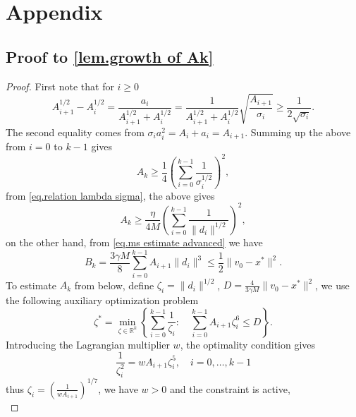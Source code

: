 \documentclass{article}
\begin{document}



\clearpage
\section*{Appendix}
\appendix
\subsection*{Proof to \autoref{lem.growth of Ak}}
\begin{proof}
    First note that for $i\geq 0$
    \begin{equation*}
        A_{i+1}^{1/2}-A_i^{1/2} = \frac{a_i}{A_{i+1}^{1/2}+A_i^{1/2}}=\frac{1}{A_{i+1}^{1/2}+A_i^{1/2}}\sqrt{\frac{A_{i+1}}{\sigma_i}}\geq \frac{1}{2\sqrt{\sigma_i}}.
    \end{equation*}
    The second equality comes from $\sigma_ia_i^2=A_i+a_i=A_{i+1}$. Summing up the above from $i=0$ to $k-1$ gives 
    \begin{equation*}
        A_k \geq \frac{1}{4} \left (\sum_{i=0}^{k-1}\frac{1}{\sigma_i^{1/2}}\right)^2,
    \end{equation*}
    from \eqref{eq.relation lambda sigma}, the above gives
    \begin{equation}\label{eq.Ak helper 1}
        A_k \geq \frac{\eta}{4M} \left (\sum_{i=0}^{k-1} \frac{1}{\|d_i\|^{1/2}}\right)^2,
    \end{equation}
    on the other hand, from \eqref{eq.ms estimate advanced} we have
    \begin{equation*}
        B_k = \frac{3\gamma M}{8}\sum_{i=0}^{k-1} A_{i+1}\|d_i\|^3 \leq \frac{1}{2}\|v_0-x^*\|^2.
    \end{equation*}
    To estimate $A_k$ from below, define $\zeta_i = \|d_i\|^{1/2}$, $D = \frac{4}{3\gamma M}\|v_0-x^*\|^2$, we use the following auxiliary optimization problem
    \begin{equation*}
\zeta^*=\min _{\zeta \in \mathbb{R}^k}\left\{\sum_{i=0}^{k-1} \frac{1}{\zeta_i}: \quad \sum_{i=0}^{k-1} A_{i+1} \zeta_i^6 \leq D\right\}.
\end{equation*}
Introducing the Lagrangian multiplier $w$, the optimality condition gives 
\begin{equation*}
\frac{1}{\zeta_i^2}=w A_{i+1} \zeta_i^5, \quad i=0, \ldots, k-1
\end{equation*}
thus $\zeta_i = \left( \frac{1}{w A_{i+1}}\right)^{1/7}$, we have $w>0$ and the constraint is active, 
\begin{equation*}

\end{equation*}
\end{proof}
\end{document}
